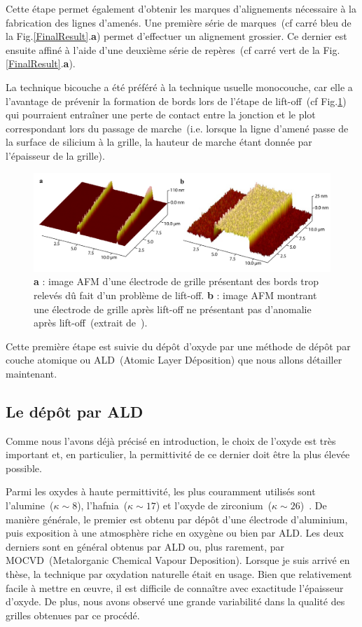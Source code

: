 Cette étape permet également d'obtenir les marques d'alignements nécessaire à la fabrication des lignes d'amenés. Une première série de marques~(cf carré bleu de la Fig.\ref{FinalResult}.\textbf{a}) permet d'effectuer un alignement grossier. Ce dernier est ensuite affiné à l'aide d'une deuxième série de repères~(cf carré vert de la Fig.\ref{FinalResult}.\textbf{a}).

La technique bicouche a été préféré à la technique usuelle monocouche, car elle a l'avantage de prévenir la formation de bords lors de l'étape de lift-off~(cf Fig.\ref{lift-off}) qui pourraient entraîner une perte de contact entre la jonction et le plot correspondant lors du passage de marche~(i.e. lorsque la ligne d'amené passe de la surface de silicium à la grille, la hauteur de marche étant donnée par l'épaisseur de la grille).


\begin{figure}
\centering \includegraphics[scale=0.45]{Fabrication/BatmanGrille/BatmanGrille.pdf}
\caption{\textbf{a} : image AFM d'une électrode de grille présentant des bords trop relevés d\^u fait d'un problème de lift-off. \textbf{b} : image AFM montrant une électrode de grille après lift-off ne présentant pas d'anomalie après lift-off~(extrait de~\cite{RochPhD}).}
\label{lift-off}
\end{figure}

Cette première étape est suivie du dépôt d'oxyde par une méthode de dépôt par couche atomique ou ALD~(Atomic Layer Déposition) que nous allons détailler maintenant.

\subsection{Le dép\^ot par ALD}

Comme nous l'avons déjà précisé en introduction, le choix de l'oxyde est très important et, en particulier, la permittivité de ce dernier doit être la plus élevée possible.

Parmi les oxydes à haute permittivité, les plus couramment utilisés sont l'alumine~($\kappa \sim 8$), l'hafnia~($\kappa \sim 17$) et l'oxyde de zirconium~($\kappa \sim 26$)~\cite{Biercuk2003}. De manière générale, le premier est obtenu par dépôt d'une électrode d'aluminium, puis exposition à une atmosphère riche en oxygène ou bien par ALD. Les deux derniers sont en général obtenus par ALD ou, plus rarement, par MOCVD~(Metalorganic Chemical Vapour Deposition). Lorsque je suis arrivé en thèse, la technique par oxydation naturelle était en usage. Bien que relativement facile à mettre en œuvre, il est difficile de connaître avec exactitude l'épaisseur d'oxyde. De plus, nous avons observé une grande variabilité dans la qualité des grilles obtenues par ce procédé.

